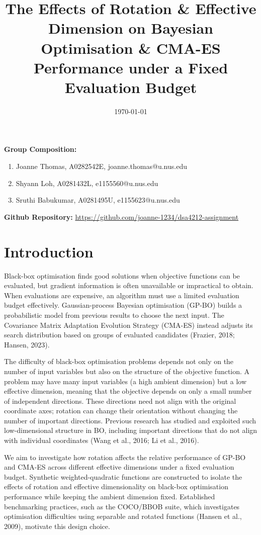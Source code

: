 \documentclass[11pt]{article}
\begin{document}
\title{The Effects of Rotation \& Effective Dimension on Bayesian Optimisation \& CMA-ES Performance under a Fixed Evaluation Budget}
\date{\today}
\maketitle

{\bf Group Composition:}
\begin{enumerate}
\item Joanne Thomas, A0282542E, joanne.thomas@u.nus.edu
\item Shyann Loh, A0281432L, e1155560@u.nus.edu
\item Sruthi Babukumar, A0281495U, e1155623@u.nus.edu
\end{enumerate}

{\bf Github Repository:} \url{https://github.com/joanne-1234/dsa4212-assignment}

%
%
\section{Introduction}

Black-box optimisation finds good solutions when objective functions can be evaluated, but gradient information is often unavailable or impractical to obtain. When evaluations are expensive, an algorithm must use a limited evaluation budget effectively. Gaussian-process Bayesian optimisation (GP-BO) builds a probabilistic model from previous results to choose the next input. The Covariance Matrix Adaptation Evolution Strategy (CMA-ES) instead adjusts its search distribution based on groups of evaluated candidates (Frazier, 2018; Hansen, 2023).

The difficulty of black-box optimisation problems depends not only on the number of input variables but also on the structure of the objective function. A problem may have many input variables (a high ambient dimension) but a low effective dimension, meaning that the objective depends on only a small number of independent directions. These directions need not align with the original coordinate axes; rotation can change their orientation without changing the number of important directions. Previous research has studied and exploited such low-dimensional structure in BO, including important directions that do not align with individual coordinates (Wang et al., 2016; Li et al., 2016).

We aim to investigate how rotation affects the relative performance of GP-BO and CMA-ES across different effective dimensions under a fixed evaluation budget. Synthetic weighted-quadratic functions are constructed to isolate the effects of rotation and effective dimensionality on black-box optimisation performance while keeping the ambient dimension fixed. Established benchmarking practices, such as the COCO/BBOB suite, which investigates optimisation difficulties using separable and rotated functions (Hansen et al., 2009), motivate this design choice.
\end{document}
